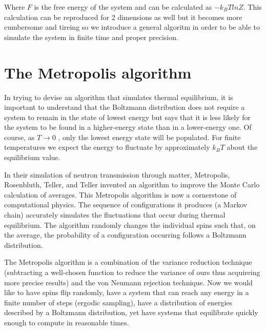 \documentclass[12pt]{article}
\theoremstyle{plain}
\begin{document}
\vspace{2mm}

\par Where $F$ is the free energy of the system and can be calculated as $- k_B T lnZ$. This calculation can be reproduced for
2 dimensions as well but it becomes more cumbersome and tireing so we introduce a general algoritm in 
order to be able to simulate the system in finite time and proper precision.

\vspace{2mm}

\section{The Metropolis algorithm}

\vspace{2mm}

\par In trying to devise an algorithm that simulates thermal equilibrium, it is important to understand
that the Boltzmann distribution does not require a system to remain in the state of lowest
energy but says that it is less likely for the system to be found in a higher-energy state than
in a lower-energy one. Of course, as $T \rightarrow 0$ , only the lowest energy state will be populated.
For finite temperatures we expect the energy to fluctuate by approximately $k_B T$ about the
equilibrium value.

\vspace{2mm}

\par In their simulation of neutron transmission through matter, Metropolis, Rosenbluth,
Teller, and Teller invented an algorithm to improve the Monte Carlo calculation
of averages. This Metropolis algorithm is now a cornerstone of computational physics. The
sequence of configurations it produces (a Markov chain) accurately simulates the fluctuations
that occur during thermal equilibrium. The algorithm randomly changes the individual spins
such that, on the average, the probability of a configuration occurring follows a Boltzmann
distribution.

\vspace{2mm}

\par The Metropolis algorithm is a combination of the variance reduction technique (subtracting a 
well-chosen function to reduce the variance of ours thus acquireing more precise results)
and the von Neumann rejection technique. Now we would like to have spins flip randomly,
have a system that can reach any energy in a finite number of steps (ergodic sampling),
have a distribution of energies described by a Boltzmann distribution,
yet have systems that equilibrate quickly enough to compute in
reasonable times.
\end{document}

